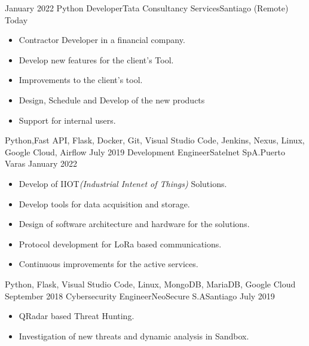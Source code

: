 %
%
%

\begin{experiences}
  \experience
    {January 2022}   {Python Developer}{Tata Consultancy Services}{Santiago (Remote)}
    {Today} 
    {
      \begin{itemize}
        \item Contractor Developer in a financial company.
        \item Develop new features for the client's Tool.
        \item Improvements to the client's tool.
        \item Design, Schedule and Develop of the new products
        \item Support for internal users.
      \end{itemize}
    }{Python,Fast API, Flask, Docker, Git, Visual Studio Code, Jenkins, Nexus, Linux, Google Cloud, Airflow}
  \emptySeparator
  \experience
    {July 2019} {Development Engineer}{Satelnet SpA.}{Puerto Varas}
    {January 2022}    
    {
      \begin{itemize}
        \item Develop of IIOT{\it (Industrial Intenet of Things)} Solutions.
        \item Develop tools for data acquisition and storage.
        \item Design of software architecture and hardware for the solutions.
        \item Protocol development for LoRa based communications.
        \item Continuous improvements for the active services.                           
      \end{itemize}
    }{Python, Flask, Visual Studio Code, Linux, MongoDB, MariaDB, Google Cloud}
  \emptySeparator
  \experience
    {September 2018}     {Cybersecurity Engineer}{NeoSecure S.A}{Santiago}
    {July 2019}    
    {
      \begin{itemize}
        \item QRadar based Threat Hunting.
        \item Investigation of new threats and dynamic analysis in Sandbox.              

\end{itemize}}
\end{experiences}

